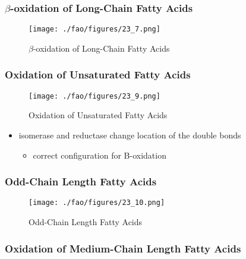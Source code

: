 \documentclass{scrartcl}
\begin{document}
\subsubsection{\(\beta\)-oxidation of Long-Chain Fatty Acids}
\label{sec:org07dbb28}
\begin{figure}[htbp]
\centering
\texttt{[image: ./fao/figures/23\_7.png]}
\caption{\label{fig:orgd315245}
\(\beta\)-oxidation of Long-Chain Fatty Acids}
\end{figure}

\subsubsection{Oxidation of Unsaturated Fatty Acids}
\label{sec:org4ee2bc3}

\begin{figure}[htbp]
\centering
\texttt{[image: ./fao/figures/23\_9.png]}
\caption{\label{fig:org3641734}
Oxidation of Unsaturated Fatty Acids}
\end{figure}

\begin{itemize}
\item isomerase and reductase change location of the double bonds
\begin{itemize}
\item correct configuration for B-oxidation
\end{itemize}
\end{itemize}
\subsubsection{Odd-Chain Length Fatty Acids}
\label{sec:orge71a618}
\begin{figure}[htbp]
\centering
\texttt{[image: ./fao/figures/23\_10.png]}
\caption{\label{fig:org779a040}
Odd-Chain Length Fatty Acids}
\end{figure}

\subsubsection{Oxidation of Medium-Chain Length Fatty Acids}
\label{sec:org2ab1c2f}
\end{document}
